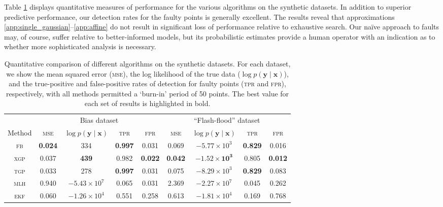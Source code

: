 \documentclass{article} %
\newcommand{\given}{\!\ensuremath{\mid}\!}
\newcommand{\bm}[1]{\ensuremath{\mathbf{#1}}}
\begin{document}
Table \ref{tbl:results} displays quantitative measures of performance
for the various algorithms on the synthetic
datasets.  
In addition to superior predictive performance, our
detection rates for the faulty points is generally excellent. The results reveal that approximations \ref{app:single_gaussian}--\ref{app:affine} do not result in significant loss of performance relative to exhaustive search. Our na\"{i}ve approach to faults may, of course, suffer relative to better-informed models, but its probabilistic estimates provide a human operator with an indication as to whether more sophisticated analysis is necessary.

\begin{table}
  \centering
  \caption{Quantitative comparison of different algorithms on the
    synthetic datasets.  For each dataset, we show the mean squared error
    (\textsc{mse}), the log likelihood of the true data ($\log p(\bm{y}
    \given \bm{x})$), and the true-positive and false-positive rates
    of detection for faulty points (\textsc{tpr} and \textsc{fpr}),
    respectively, with all methods permitted a `burn-in' period of 50 points. The best value for each set of results is highlighted in
    bold.}
  \label{tbl:results}
  \begin{tabular}{ccccccccc}
    \toprule
& \multicolumn{4}{c}{Bias dataset} & \multicolumn{4}{c}{``Flash-flood'' dataset}\\
    \cmidrule(l){2-5} \cmidrule(l){6-9}
    Method & \scshape{mse} & $\log p(\bm{y}\given\bm{x})$ & \scshape{tpr} & \scshape{fpr} 
& \scshape{mse} & $\log p(\bm{y}\given\bm{x})$ & \scshape{tpr} & \scshape{fpr} \\
\midrule
    \scshape{fb} & \textbf{0.024} & 334 & \textbf{0.997} & 0.031 & 0.069 & $-5.77\times 10^3$ & \textbf{0.829} & {0.016} \\
    \scshape{xgp} & 0.037 & \textbf{439} & 0.982 & \textbf{0.022} & \textbf{0.042} & $\mathbf{-1.52 \times 10^3}$ & 0.805 & \textbf{0.012} \\
    \scshape{tgp} & 0.033 & 278 & \textbf{0.997} & 0.031 & 0.075 & $-8.29\times 10^3$ & \textbf{0.829} & 0.083 \\
    \scshape{mlh} & 0.940 & $-5.43\times 10^7$ & 0.065 & 0.031 & 2.369 & $-2.27\times 10^7$ & 0.045 & 0.262 \\
   \scshape{ekf} & 0.060 & $-1.26 \times 10^4$ & 0.551 & 0.258 & 0.613 & $-1.81\times 10^4$ & 0.169 & 0.768 \\
    \bottomrule
  \end{tabular}
\end{table}
\end{document}
